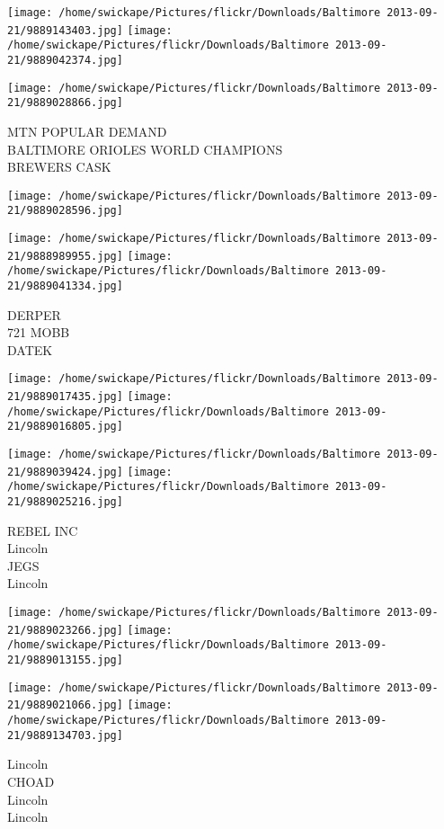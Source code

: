 \documentclass[10pt,letterpaper]{article}
\begin{document}
\texttt{[image: /home/swickape/Pictures/flickr/Downloads/Baltimore 2013-09-21/9889143403.jpg]}
\texttt{[image: /home/swickape/Pictures/flickr/Downloads/Baltimore 2013-09-21/9889042374.jpg]}

\texttt{[image: /home/swickape/Pictures/flickr/Downloads/Baltimore 2013-09-21/9889028866.jpg]}

MTN POPULAR DEMAND\\
BALTIMORE ORIOLES WORLD CHAMPIONS\\
BREWERS CASK
\pagebreak

\texttt{[image: /home/swickape/Pictures/flickr/Downloads/Baltimore 2013-09-21/9889028596.jpg]}

\vspace{0.25in}
\texttt{[image: /home/swickape/Pictures/flickr/Downloads/Baltimore 2013-09-21/9888989955.jpg]}
\texttt{[image: /home/swickape/Pictures/flickr/Downloads/Baltimore 2013-09-21/9889041334.jpg]}

DERPER\\
721 MOBB\\
DATEK
\pagebreak

\texttt{[image: /home/swickape/Pictures/flickr/Downloads/Baltimore 2013-09-21/9889017435.jpg]}
\texttt{[image: /home/swickape/Pictures/flickr/Downloads/Baltimore 2013-09-21/9889016805.jpg]}

\texttt{[image: /home/swickape/Pictures/flickr/Downloads/Baltimore 2013-09-21/9889039424.jpg]}
\texttt{[image: /home/swickape/Pictures/flickr/Downloads/Baltimore 2013-09-21/9889025216.jpg]}

REBEL INC\\
Lincoln\\
JEGS\\
Lincoln
\pagebreak

\texttt{[image: /home/swickape/Pictures/flickr/Downloads/Baltimore 2013-09-21/9889023266.jpg]}
\texttt{[image: /home/swickape/Pictures/flickr/Downloads/Baltimore 2013-09-21/9889013155.jpg]}

\texttt{[image: /home/swickape/Pictures/flickr/Downloads/Baltimore 2013-09-21/9889021066.jpg]}
\texttt{[image: /home/swickape/Pictures/flickr/Downloads/Baltimore 2013-09-21/9889134703.jpg]}

Lincoln\\
CHOAD\\
Lincoln\\
Lincoln
\pagebreak
\end{document}
